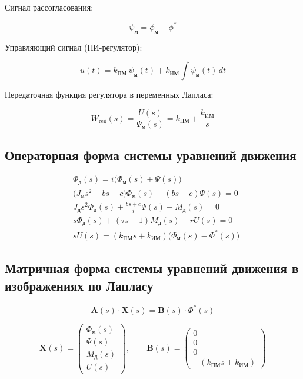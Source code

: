 \documentclass[14pt]{extreport}
\begin{document}
{Сигнал рассогласования:

\[
\psi_{\text{м}} = \phi_{\text{м}} - \phi^*
\]

Управляющий сигнал (ПИ-регулятор):

\[
u(t) = k_{\text{ПМ}} \, \psi_{\text{м}}(t) + k_{\text{ИМ}} \int \psi_{\text{м}}(t) \, dt
\]

Передаточная функция регулятора в переменных Лапласа:

\[
W_{\text{reg}}(s) = \frac{U(s)}{\Psi_{\text{м}}(s)} = k_{\text{ПМ}} + \frac{k_{\text{ИМ}}}{s}
\]

\subsection{Операторная форма системы уравнений движения}

\[
\begin{aligned}
&\Phi_{\text{д}}(s) = i \bigl( \Phi_{\text{м}}(s) + \Psi(s) \bigr) \\[4pt]
&\bigl( J_{\text{м}} s^2 - b s - c \bigr) \Phi_{\text{м}}(s) + (b s + c) \Psi(s) = 0 \\[4pt]
&J_{\text{д}} s^2 \Phi_{\text{д}}(s) + \frac{b s + c}{i} \Psi(s) - M_{\text{д}}(s) = 0 \\[4pt]
&s \Phi_{\text{д}}(s) + (\tau s + 1) M_{\text{д}}(s) - r U(s) = 0 \\[4pt]
&s U(s) = \left( k_{\text{ПМ}} s + k_{\text{ИМ}} \right) \bigl( \Phi_{\text{м}}(s) - \Phi^*(s) \bigr)
\end{aligned}
\]

 \subsection{Матричная форма системы уравнений движения в изображениях по Лапласу}

\[
\mathbf{A}(s) \cdot \mathbf{X}(s) = \mathbf{B}(s) \cdot \Phi^*(s)
\]

\[
\mathbf{X}(s) = \begin{pmatrix} \Phi_{\text{м}}(s) \\ \Psi(s) \\ M_{\text{д}}(s) \\ U(s) \end{pmatrix}, \qquad
\mathbf{B}(s) = \begin{pmatrix} 0 \\ 0 \\ 0 \\ -(k_{\text{ПМ}} s + k_{\text{ИМ}}) \end{pmatrix}
\]

}
\end{document}
